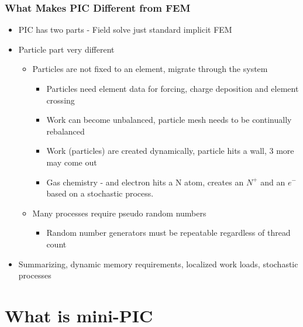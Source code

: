 \documentclass[t]{beamer}
\begin{document}
\begin{frame}
 
 \frametitle{What Makes PIC Different from FEM}
 \begin{itemize}
 \item PIC has two parts - Field solve just standard implicit FEM
 \item Particle part very different
 \begin{itemize}
 \item Particles are not fixed to an element, migrate through the system
 \begin{itemize}
 \item Particles need element data for forcing, charge deposition and
   element crossing
 \item Work can become unbalanced, particle mesh needs to be continually rebalanced
 \item Work (particles) are created dynamically, particle hits a wall, 3 more may come out 
 \item Gas chemistry - and electron hits a N atom, creates an $N^+$ and an $e^-$ based on a stochastic process.  
 \end{itemize}
 \item Many processes require pseudo random numbers
 \begin{itemize}
 \item Random number generators must be repeatable regardless of thread count
 \end{itemize}
 \end{itemize}
 \item Summarizing, dynamic memory requirements, localized work loads, stochastic processes
 \end{itemize}

\end{frame}

\section{What is mini-PIC}
\end{document}
